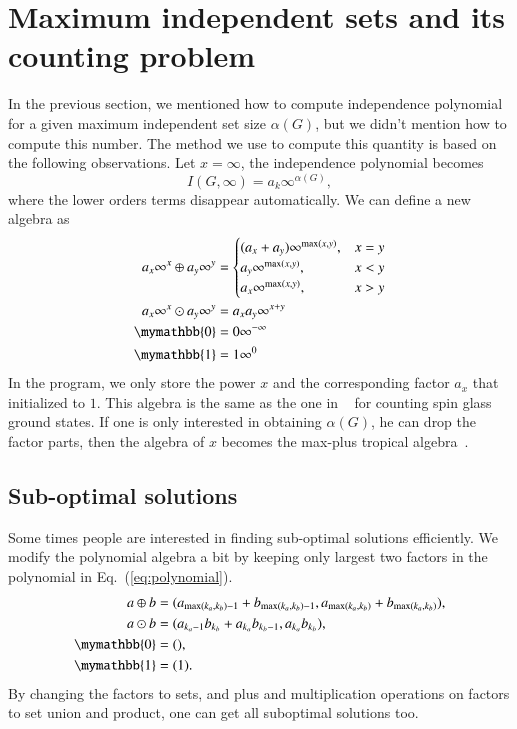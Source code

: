 \documentclass[review,onefignum,onetabnum]{siamart190516}
\newcommand{\<}{\langle}
\renewcommand{\>}{\rangle}
\newcommand{\Eq}[1]{Eq.~(\ref{#1})}
\begin{document}
\section{Maximum independent sets and its counting problem}
In the previous section, we mentioned how to compute independence polynomial for a given maximum independent set size $\alpha(G)$, but we didn't mention how to compute this number.
The method we use to compute this quantity is based on the following observations. Let $x=\infty$, the independence polynomial becomes
\begin{equation}
I(G, \infty) = a_k \infty^{\alpha(G)},
\end{equation}
where the lower orders terms disappear automatically. We can define a new algebra as
\begin{align}
\begin{split}
    a_x\infty^x \oplus a_y\infty^y &= \begin{cases}
        (a_x + a_y)\infty^{\max(x,y)}, & x = y\\
        a_y\infty^{\max(x,y)}, & x < y\\
        a_x\infty^{\max(x,y)}, & x > y
    \end{cases}\\
    a_x\infty^x \odot a_y\infty^y &= a_x a_y\infty^{x+y}\\
    \mymathbb{0} &= 0\infty^{-\infty}\\
    \mymathbb{1} &= 1\infty^{0}\label{eq:countingtropical}
\end{split}
\end{align}
In the program, we only store the power $x$ and the corresponding factor $a_x$ that initialized to $1$.
This algebra is the same as the one in ~\cite{Liu2021} for counting spin glass ground states.
If one is only interested in obtaining $\alpha(G)$, he can drop the factor parts, then the algebra of $x$ becomes the max-plus tropical algebra~\cite{Maclagan2015,Moore2011}.

\subsection{Sub-optimal solutions}
Some times people are interested in finding sub-optimal solutions efficiently.
We modify the polynomial algebra a bit by keeping only largest two factors in the polynomial in \Eq{eq:polynomial}.
\begin{align}
    \begin{split}
    a \oplus b &= (a_{\max(k_a, k_b)-1} + b_{\max(k_a, k_b)-1}, a_{\max(k_a, k_b)} + b_{\max(k_a, k_b)}),\\
    a \odot b &= (a_{k_a-1} b_{k_b}+a_{k_a} b_{k_b-1}, a_{k_a} b_{k_b}),\\
    \mymathbb{0} &= (),\\
    \mymathbb{1} &= (1).\label{eq:max2poly}
    \end{split}
\end{align}
By changing the factors to sets, and plus and multiplication operations on factors to set union and product, one can get all suboptimal solutions too.
\end{document}
